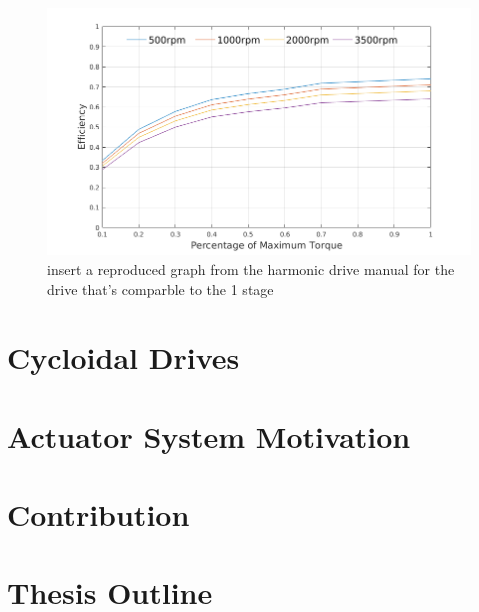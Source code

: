 \begin{figure}[!b]
   \centering
   \includegraphics[width=0.7\linewidth]{fig/harmonic_eff}
   \caption{insert a reproduced graph from the harmonic drive manual for the drive that's comparble to the 1 stage }
   \label{fig:harmonic_eff}
\end{figure}

\section{Cycloidal Drives} \label{intro:cycloid}

\section{Actuator System Motivation} \label{intro:projects}

\section{Contribution} \label{intro:contribution}

\section{Thesis Outline} 
